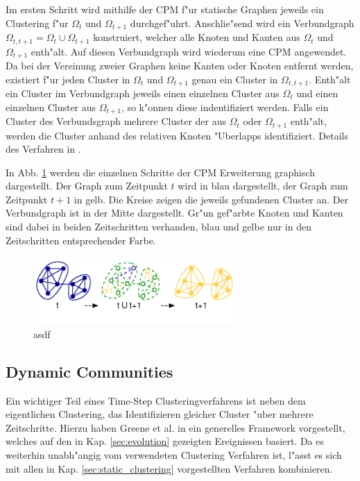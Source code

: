 \documentclass[journal]{vgtc}
\begin{document}
    Im ersten Schritt wird mithilfe der CPM f"ur statische Graphen jeweils ein Clustering f"ur $\Omega_{t}$ und $\Omega_{t+1}$ durchgef"uhrt.
    Anschlie"send wird ein Verbundgraph $\Omega_{t,t+1} = \Omega_{t} \cup \Omega_{t+1}$ konstruiert, welcher alle Knoten und Kanten aus
    $\Omega_t$ und $\Omega_{t+1}$ enth"alt. Auf diesen Verbundgraph wird wiederum eine CPM angewendet. Da bei der Vereinung zweier Graphen
    keine Kanten oder Knoten entfernt werden, existiert f"ur jeden Cluster in $\Omega_t$ und $\Omega_{t+1}$ genau ein Cluster in $\Omega_{t,t+1}$.
    Enth"alt ein Cluster im Verbundgraph jeweils einen einzelnen Cluster aus $\Omega_t$ und einen einzelnen Cluster aus $\Omega_{t+1}$,
    so k"onnen diese indentifiziert werden. Falls ein Cluster des Verbundsgraph mehrere Cluster der aus $\Omega_t$ oder $\Omega_{t+1}$
    enth"alt, werden die Cluster anhand des relativen Knoten "Uberlapps identifiziert. Details des Verfahren in \cite{CPM_time}.
    
    In Abb. \ref{fig:CPM_time} werden die einzelnen Schritte der CPM Erweiterung graphisch dargestellt. Der Graph zum Zeitpunkt $t$ wird
    in blau dargestellt, der Graph zum Zeitpunkt $t+1$ in gelb. Die Kreise zeigen die jeweils gefundenen Cluster an. Der Verbundgraph ist
    in der Mitte dargestellt. Gr"un gef"arbte Knoten und Kanten sind dabei in beiden Zeitschritten verhanden, blau und gelbe nur in den
    Zeitschritten entsprechender Farbe.
    
    \begin{figure}[h]
      \centering
      \includegraphics[width=3in]{images/CPM_time}
      \caption{\label{fig:CPM_time} asdf \cite{CPM_time}}
    \end{figure}

    
  \subsection{Dynamic Communities}
    Ein wichtiger Teil eines Time-Step Clusteringverfahrens ist neben dem eigentlichen Clustering, das Identifizieren gleicher Cluster
    "uber mehrere Zeitschritte. Hierzu haben Greene et al. in \cite{timestep} ein generelles Framework vorgestellt, welches auf den
    in Kap. \ref{sec:evolution} gezeigten Ereignissen basiert. Da es weiterhin unabh"angig vom verwendeten Clustering Verfahren ist,
    l"asst es sich mit allen in Kap. \ref{sec:static_clustering} vorgestellten Verfahren kombinieren.
    
\end{document}
